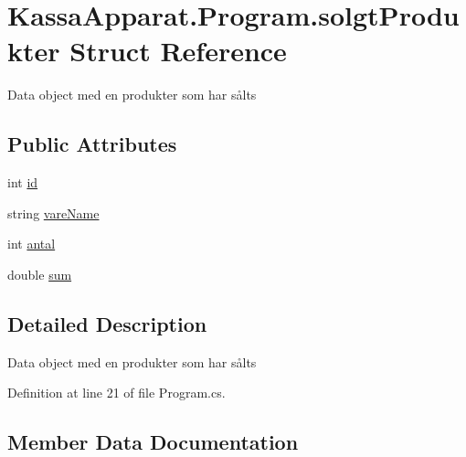 \hypertarget{struct_kassa_apparat_1_1_program_1_1solgt_produkter}{}\section{Kassa\+Apparat.\+Program.\+solgt\+Produkter Struct Reference}
\label{struct_kassa_apparat_1_1_program_1_1solgt_produkter}


Data object med en produkter som har sålts  


\subsection*{Public Attributes}
\begin{DoxyCompactItemize}
\item 
int \mbox{\hyperlink{struct_kassa_apparat_1_1_program_1_1solgt_produkter_a0063dc7c2f978c801af3fe665e08c8d7}{id}}
\item 
string \mbox{\hyperlink{struct_kassa_apparat_1_1_program_1_1solgt_produkter_a799e2638600ea15673cafa67f1eb3055}{vare\+Name}}
\item 
int \mbox{\hyperlink{struct_kassa_apparat_1_1_program_1_1solgt_produkter_a25a2fd9fd6485aedd0549d0cee20a20e}{antal}}
\item 
double \mbox{\hyperlink{struct_kassa_apparat_1_1_program_1_1solgt_produkter_a585555c69997402c531c9522123e5df0}{sum}}
\end{DoxyCompactItemize}


\subsection{Detailed Description}
Data object med en produkter som har sålts 



Definition at line 21 of file Program.\+cs.



\subsection{Member Data Documentation}
\mbox{\label{struct_kassa_apparat_1_1_program_1_1solgt_produkter_a25a2fd9fd6485aedd0549d0cee20a20e}} 
